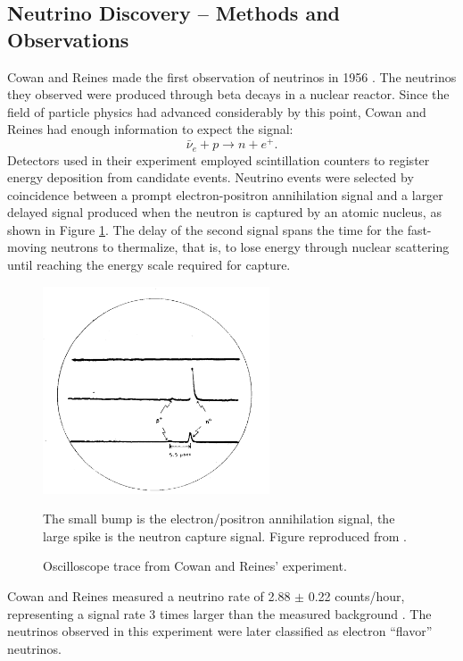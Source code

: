 \subsection{Neutrino Discovery -- Methods and Observations}
\label{discovery}


Cowan and Reines made the first observation of neutrinos in 1956
\cite{cowanNature}.
The neutrinos they observed were produced through beta decays in a nuclear
reactor.  Since the field of particle physics had advanced considerably by this
point, Cowan and Reines had enough information to expect the signal:
\begin{equation} \label{beta} \bar{\nu}_e + p \rightarrow n + e^+.  \end{equation}
Detectors used in their experiment employed scintillation counters to register
energy deposition from candidate events.  Neutrino events were selected by
coincidence between a prompt electron-positron annihilation signal and a larger delayed signal produced when the neutron is captured by an atomic
nucleus, as shown in Figure \ref{oscilloscope}.
The delay of the second signal spans the time for the fast-moving neutrons to
thermalize, that is, to lose energy through nuclear scattering until reaching
the energy scale required for capture.

\begin{figure}
  \begin{center}
    \includegraphics[width=0.6\textwidth]{figures/figures/cowanOscilloscope.png}
  \end{center}
  \caption{Oscilloscope trace from Cowan and Reines' experiment.}{ The small
  bump is the electron/positron annihilation signal, the large spike is the
  neutron capture signal.  Figure reproduced from \cite{cowanNature}.}
  \label{oscilloscope}
\end{figure}
Cowan and Reines measured a neutrino rate of 2.88 $\pm$ 0.22 counts/hour,
representing a signal rate 3 times larger than the measured background
 \cite{cowan}.
The neutrinos observed in this experiment were later classified as
electron ``flavor''  neutrinos.

